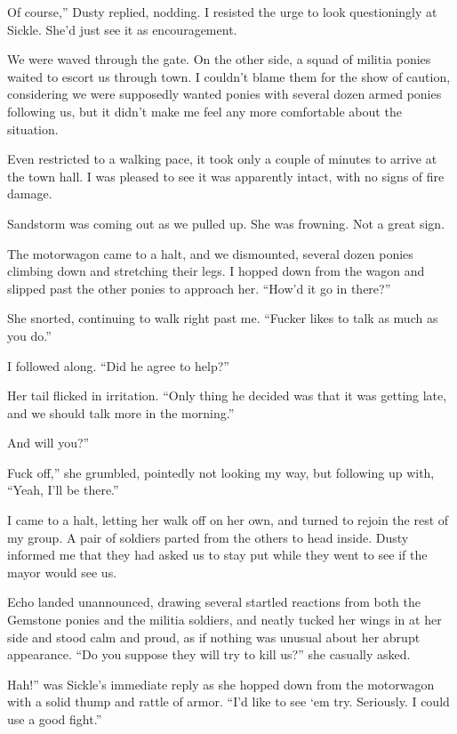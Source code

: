 \leavevmode{}Of course,” Dusty replied, nodding. I resisted the urge to look questioningly at Sickle. She’d just see it as encouragement.

We were waved through the gate. On the other side, a squad of militia ponies waited to escort us through town. I couldn’t blame them for the show of caution, considering we were supposedly wanted ponies with several dozen armed ponies following us, but it didn’t make me feel any more comfortable about the situation.

Even restricted to a walking pace, it took only a couple of minutes to arrive at the town hall. I was pleased to see it was apparently intact, with no signs of fire damage.

Sandstorm was coming out as we pulled up. She was frowning. Not a great sign.

The motorwagon came to a halt, and we dismounted, several dozen ponies climbing down and stretching their legs. I hopped down from the wagon and slipped past the other ponies to approach her. “How’d it go in there?”

She snorted, continuing to walk right past me. “Fucker likes to talk as much as you do.”

I followed along. “Did he agree to help?”

Her tail flicked in irritation. “Only thing he decided was that it was getting late, and we should talk more in the morning.”

\leavevmode{}And will you?”

\leavevmode{}Fuck off,” she grumbled, pointedly not looking my way, but following up with, “Yeah, I’ll be there.”

I came to a halt, letting her walk off on her own, and turned to rejoin the rest of my group. A pair of soldiers parted from the others to head inside. Dusty informed me that they had asked us to stay put while they went to see if the mayor would see us.

Echo landed unannounced, drawing several startled reactions from both the Gemstone ponies and the militia soldiers, and neatly tucked her wings in at her side and stood calm and proud, as if nothing was unusual about her abrupt appearance. “Do you suppose they will try to kill us?” she casually asked.

\leavevmode{}Hah!” was Sickle’s immediate reply as she hopped down from the motorwagon with a solid thump and rattle of armor. “I’d like to see ‘em try. Seriously. I could use a good fight.”

